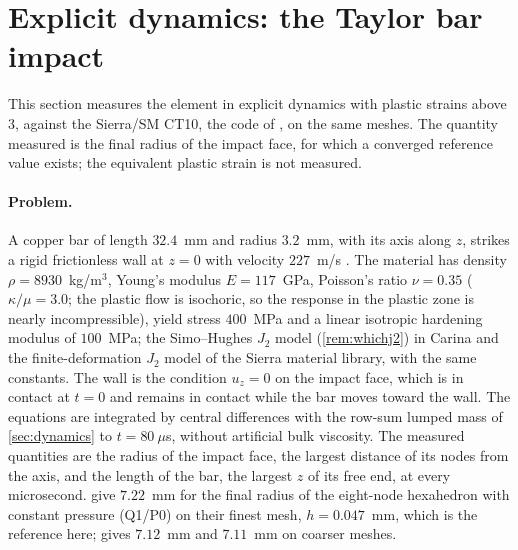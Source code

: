 \documentclass{article}
\theoremstyle{definition}
\theoremstyle{plain}
\begin{document}
\section{Explicit dynamics: the Taylor bar impact}
\label{sec:taylor}

This section measures the element in explicit dynamics with plastic
strains above $3$, against the Sierra/SM CT10, the code
of \textcite{Foulk.etal:2021}, on the same meshes. The quantity measured is
the final radius of the impact face, for which a converged reference value
exists; the equivalent plastic strain is not measured.

\paragraph{Problem.} A copper bar of length $32.4$~mm and radius $3.2$~mm,
with its axis along $z$, strikes a rigid frictionless wall at $z = 0$ with
velocity $227$~m/s \cite{WilkinsGuinan:1973,Simo:1992,Foulk.etal:2021}.
The material has density $\rho = 8930$~kg/m$^3$, Young's modulus
$E = 117$~GPa, Poisson's ratio $\nu = 0.35$ ($\kappa/\mu = 3.0$; the
plastic flow is isochoric, so the response in the plastic zone is nearly
incompressible), yield
stress $400$~MPa and a linear isotropic hardening modulus of $100$~MPa; the
Simo--Hughes $J_2$ model (\cref{rem:whichj2}) in Carina and the
finite-deformation $J_2$ model of the Sierra material library, with the
same constants. The wall is the condition $u_z = 0$ on the impact face,
which is in contact at $t = 0$ and remains in contact while the bar moves
toward the wall. The equations are integrated by central differences with
the row-sum lumped mass of \cref{sec:dynamics} to $t = 80~\mu$s, without
artificial bulk viscosity. The measured quantities are the radius of the
impact face, the largest distance of its nodes from the axis, and the
length of the bar, the largest $z$ of its free end, at every microsecond.
\textcite{Foulk.etal:2021} give $7.22$~mm for the final radius of the
eight-node hexahedron with constant pressure (Q1/P0) on their finest mesh,
$h = 0.047$~mm, which is the reference here; \textcite{Simo:1992} gives
$7.12$~mm and \textcite{ZienkiewiczEtAl:1998} $7.11$~mm on coarser meshes.
\end{document}
